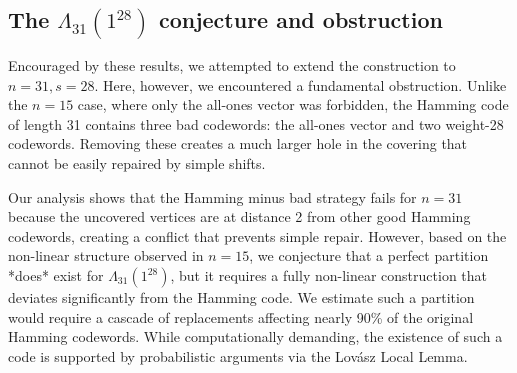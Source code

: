 \subsection{The $\Lambda_{31}(1^{28})$ conjecture and obstruction}
Encouraged by these results, we attempted to extend the construction to $n=31, s=28$. Here, however, we encountered a fundamental obstruction. Unlike the $n=15$ case, where only the all-ones vector was forbidden, the Hamming code of length 31 contains three bad codewords: the all-ones vector and two weight-28 codewords. Removing these creates a much larger hole in the covering that cannot be easily repaired by simple shifts.

Our analysis shows that the Hamming minus bad strategy fails for $n=31$ because the uncovered vertices are at distance 2 from other good Hamming codewords, creating a conflict that prevents simple repair. However, based on the non-linear structure observed in $n=15$, we conjecture that a perfect partition *does* exist for $\Lambda_{31}(1^{28})$, but it requires a fully non-linear construction that deviates significantly from the Hamming code. We estimate such a partition would require a cascade of replacements affecting nearly 90\% of the original Hamming codewords. While computationally demanding, the existence of such a code is supported by probabilistic arguments via the Lovász Local Lemma.


